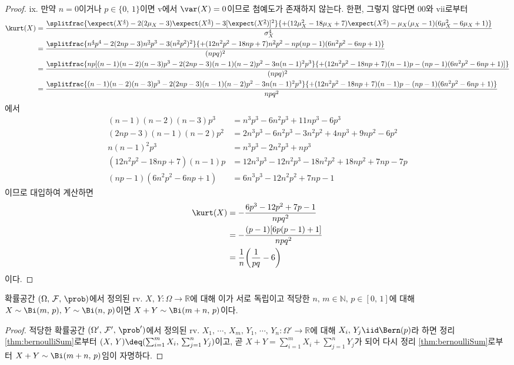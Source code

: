 \begin{proof}
    ix. 만약 $n=0$이거나 $p\in\{0,\,1\}$이면 v에서 $\var(X)=0$이므로 첨예도가 존재하지 않는다. 한편, 그렇지 않다면 00와 vii로부터
    \begin{align*}
        \kurt(X)&=\frac{\splitfrac{\expect(X^{\underline{4}})-2(2\mu_X-3)\expect(X^{\underline{3}})-3[\expect(X^{\underline{2}})]^2}{+(12\mu_X^2-18\mu_X+7)\expect(X^{\underline{2}})-\mu_X(\mu_X-1)(6\mu_X^2-6\mu_X+1)}}{\sigma_X^4}\\
        &=\frac{\splitfrac{n^{\underline{4}}p^4-2(2np-3)n^{\underline{3}}p^3-3(n^{\underline{2}}p^2)^2}{+(12n^2p^2-18np+7)n^{\underline{2}}p^2-np(np-1)(6n^2p^2-6np+1)}}{(npq)^2}\\
        &=\frac{\splitfrac{np[(n-1)(n-2)(n-3)p^3-2(2np-3)(n-1)(n-2)p^2-3n(n-1)^2p^3}{+(12n^2p^2-18np+7)(n-1)p-(np-1)(6n^2p^2-6np+1)]}}{(npq)^2}\\
        &=\frac{\splitfrac{(n-1)(n-2)(n-3)p^3-2(2np-3)(n-1)(n-2)p^2-3n(n-1)^2p^3}{+(12n^2p^2-18np+7)(n-1)p-(np-1)(6n^2p^2-6np+1)}}{npq^2}
    \end{align*}
    에서
    \begin{align*}
        (n-1)(n-2)(n-3)p^3&=n^3p^3-6n^2p^3+11np^3-6p^3\\
        (2np-3)(n-1)(n-2)p^2&=2n^3p^3-6n^2p^3-3n^2p^2+4np^3+9np^2-6p^2\\
        n(n-1)^2p^3&=n^3p^3-2n^2p^3+np^3\\
        (12n^2p^2-18np+7)(n-1)p&=12n^3p^3-12n^2p^3-18n^2p^2+18np^2+7np-7p\\
        (np-1)(6n^2p^2-6np+1)&=6n^3p^3-12n^2p^2+7np-1
    \end{align*}
    이므로 대입하여 계산하면
    \begin{align*}
        \kurt(X)&=-\frac{6p^3-12p^2+7p-1}{npq^2}\\
        &=-\frac{(p-1)[6p(p-1)+1]}{npq^2}\\
        &=\frac{1}{n}\bigg(\frac{1}{pq}-6\bigg)
    \end{align*}
    이다.
\end{proof}

\begin{theorem}
    확률공간 $(\Omega,\,\mathcal{F},\,\prob)$에서 정의된 rv. $X,\,Y:\Omega\to\mathbb{R}$에 대해 이가 서로 독립이고 적당한 $n,\,m\in\mathbb{N},\,p\in[0,\,1]$에 대해 $X\sim\Bi(m,\,p),\,Y\sim\Bi(n,\,p)$이면 $X+Y\sim\Bi(m+n,\,p)$이다.
\end{theorem}

\begin{proof}
    적당한 확률공간 $(\Omega',\,\mathcal{F}',\,\prob')$에서 정의된 rv. $X_1,\,\cdots,\,X_m,\,Y_1,\,\cdots,\,Y_n:\Omega'\to\mathbb{R}$에 대해 $X_i,\,Y_j\iid\Bern(p)$라 하면 정리 \ref{thm:bernoulliSum}로부터 $(X,\,Y)\deq(\sum_{i=1}^mX_i,\,\sum_{j=1}^nY_j)$이고, 곧 $X+Y=\sum_{i=1}^mX_i+\sum_{j=1}^nY_j$가 되어 다시 정리 \ref{thm:bernoulliSum}로부터 $X+Y\sim\Bi(m+n,\,p)$임이 자명하다.
\end{proof}


